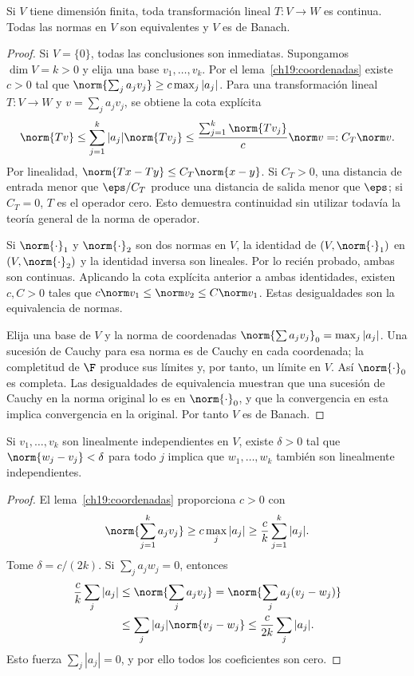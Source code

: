 \begin{corolario}\label{ch22:lineal-finito}
Si $V$ tiene dimensión finita, toda transformación lineal $T:V\to W$ es continua. Todas las normas en $V$ son equivalentes y $V$ es de Banach.
\end{corolario}
\begin{proof}
Si $V=\{0\}$, todas las conclusiones son inmediatas. Supongamos $\dim V=k>0$ y elija una base $v_1,\ldots,v_k$. Por el lema~\ref{ch19:coordenadas} existe $c>0$ tal que $\norm{\sum_j a_jv_j}\geq c\max_j|a_j|$. Para una transformación lineal $T:V\to W$ y $v=\sum_j a_jv_j$, se obtiene la cota explícita
\[
 \norm{Tv}\leq\sum_{j=1}^k|a_j|\norm{Tv_j}
 \leq\frac{\sum_{j=1}^k\norm{Tv_j}}{c}\norm v=:C_T\norm v.
\]
Por linealidad, $\norm{Tx-Ty}\leq C_T\norm{x-y}$. Si $C_T>0$, una distancia de entrada menor que $\eps/C_T$ produce una distancia de salida menor que $\eps$; si $C_T=0$, $T$ es el operador cero. Esto demuestra continuidad sin utilizar todavía la teoría general de la norma de operador.

Si $\norm{\cdot}_1$ y $\norm{\cdot}_2$ son dos normas en $V$, la identidad de $(V,\norm{\cdot}_1)$ en $(V,\norm{\cdot}_2)$ y la identidad inversa son lineales. Por lo recién probado, ambas son continuas. Aplicando la cota explícita anterior a ambas identidades, existen $c,C>0$ tales que $c\norm v_1\leq\norm v_2\leq C\norm v_1$. Estas desigualdades son la equivalencia de normas.

Elija una base de $V$ y la norma de coordenadas $\norm{\sum a_jv_j}_0=\max_j|a_j|$. Una sucesión de Cauchy para esa norma es de Cauchy en cada coordenada; la completitud de $\F$ produce sus límites y, por tanto, un límite en $V$. Así $\norm{\cdot}_0$ es completa. Las desigualdades de equivalencia muestran que una sucesión de Cauchy en la norma original lo es en $\norm{\cdot}_0$, y que la convergencia en esta implica convergencia en la original. Por tanto $V$ es de Banach.
\end{proof}

\begin{proposicion}\label{ch22:independencia}
Si $v_1,\ldots,v_k$ son linealmente independientes en $V$, existe $\delta>0$ tal que $\norm{w_j-v_j}<\delta$ para todo $j$ implica que $w_1,\ldots,w_k$ también son linealmente independientes.
\end{proposicion}
\begin{proof}
El lema~\ref{ch19:coordenadas} proporciona $c>0$ con
\[
 \norm{\sum_{j=1}^k a_jv_j}\geq c\max_j|a_j|
 \geq\frac ck\sum_{j=1}^k|a_j|.
\]
Tome $\delta=c/(2k)$. Si $\sum_j a_jw_j=0$, entonces
\begin{align*}
 \frac ck\sum_j|a_j|
 &\leq\norm{\sum_j a_jv_j}
 =\norm{\sum_j a_j(v_j-w_j)}\\
 &\leq\sum_j|a_j|\norm{v_j-w_j}
 \leq\frac c{2k}\sum_j|a_j|.
\end{align*}
Esto fuerza $\sum_j|a_j|=0$, y por ello todos los coeficientes son cero.
\end{proof}

